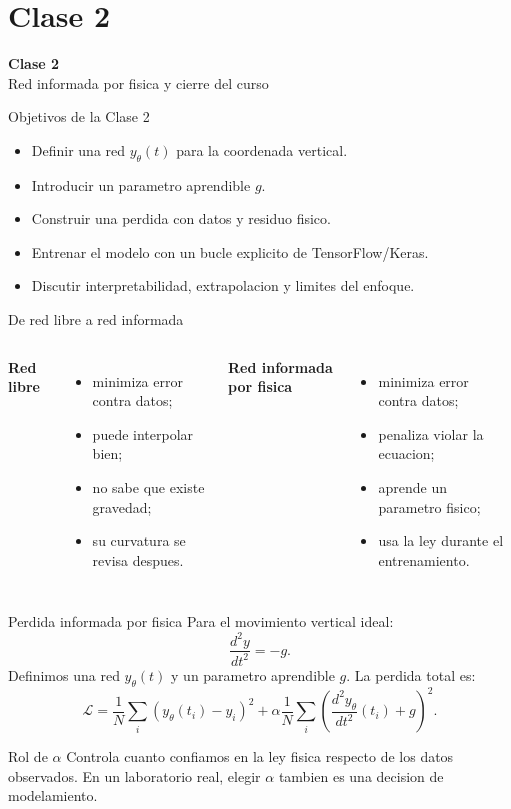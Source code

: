 \section{Clase 2}

\begin{frame}[plain]
\centering
\vfill
{\Huge \bfseries Clase 2}\\[0.4cm]
{\Large Red informada por fisica y cierre del curso}
\vfill
\end{frame}

\begin{frame}{Objetivos de la Clase 2}
\begin{itemize}
    \item Definir una red $y_\theta(t)$ para la coordenada vertical.
    \item Introducir un parametro aprendible $g$.
    \item Construir una perdida con datos y residuo fisico.
    \item Entrenar el modelo con un bucle explicito de TensorFlow/Keras.
    \item Discutir interpretabilidad, extrapolacion y limites del enfoque.
\end{itemize}
\end{frame}

\begin{frame}{De red libre a red informada}
\begin{columns}[T,onlytextwidth]
\textbf{Red libre}
\begin{itemize}
    \item minimiza error contra datos;
    \item puede interpolar bien;
    \item no sabe que existe gravedad;
    \item su curvatura se revisa despues.
\end{itemize}
\textbf{Red informada por fisica}
\begin{itemize}
    \item minimiza error contra datos;
    \item penaliza violar la ecuacion;
    \item aprende un parametro fisico;
    \item usa la ley durante el entrenamiento.
\end{itemize}
\end{columns}
\end{frame}

\begin{frame}{Perdida informada por fisica}
Para el movimiento vertical ideal:
\[
    \frac{d^2y}{dt^2} = -g.
\]
Definimos una red $y_\theta(t)$ y un parametro aprendible $g$. La perdida total es:
\[
    \mathcal{L}=\frac{1}{N}\sum_i \left(y_\theta(t_i)-y_i\right)^2+
    \alpha\frac{1}{N}\sum_i \left(\frac{d^2y_\theta}{dt^2}(t_i)+g\right)^2.
\]
\begin{block}{Rol de $\alpha$}
Controla cuanto confiamos en la ley fisica respecto de los datos observados. En un laboratorio real, elegir $\alpha$ tambien es una decision de modelamiento.
\end{block}
\end{frame}

